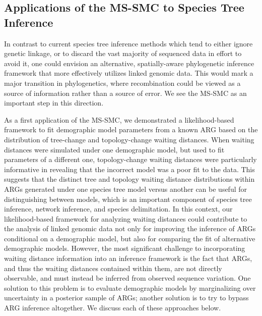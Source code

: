 \documentclass[11pt]{article}
\begin{document}
\subsection{Applications of the MS-SMC to Species Tree Inference}

In contrast to current species tree inference methods 
which tend to either ignore genetic linkage, or to discard the vast majority
of sequenced data in effort to avoid it, one could envision an alternative, 
spatially-aware phylogenetic inference framework that more effectively 
utilizes linked genomic data. This would mark a major transition in phylogenetics,
where recombination could be viewed as a source of information rather than a 
source of error. 
We see the MS-SMC as an important step in this direction. 


As a first application of the MS-SMC, we demonstrated a likelihood-based
framework to fit demographic model parameters from a known ARG based on
the distribution of tree-change and topology-change waiting distances. 
% 
When waiting distances were simulated under one demographic model, 
but used to fit parameters of a different one, 
topology-change waiting distances were particularly informative in
revealing that the incorrect model was a poor fit to the data.
% 
This suggests that the distinct tree and topology waiting 
distance distributions within ARGs generated under one species
tree model versus another can be useful for distinguishing 
between models, which is an important component of species
tree inference, network inference, and species delimitation.
% 
In this context, our likelihood-based framework for analyzing 
waiting distances could contribute to the analysis of 
linked genomic data not only for improving the inference of 
ARGs conditional on a demographic model, but also for 
comparing the fit of alternative demographic models.
% 
However, the most significant challenge to incorporating waiting distance
information into an inference framework is the fact that ARGs, and thus 
the waiting distances contained within them, are not directly observable, 
and must instead be inferred from observed sequence variation. 
% 
One solution to this problem is to evaluate demographic models by 
marginalizing over uncertainty in a posterior sample of ARGs; 
another solution is to try to bypass ARG inference altogether.
We discuss each of these approaches below.
\end{document}
